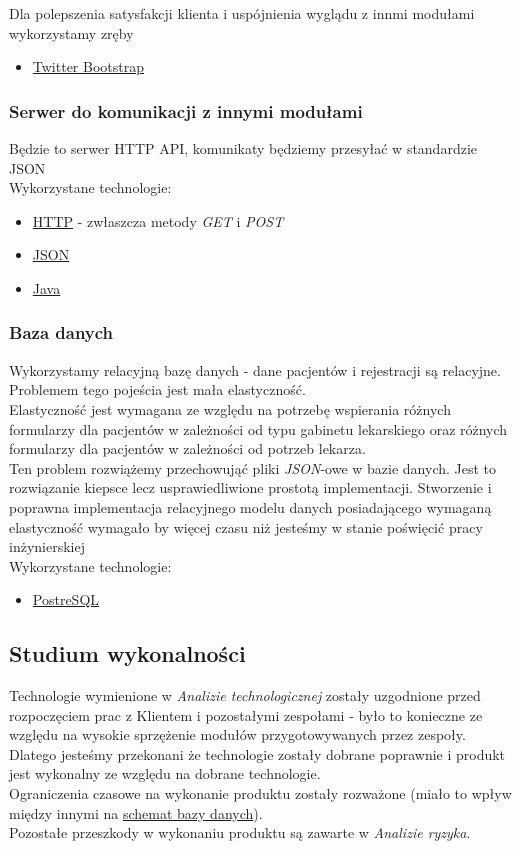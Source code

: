 \documentclass[10pt,a4paper]{article}
\begin{document}
Dla polepszenia satysfakcji klienta i uspójnienia wyglądu z innmi modułami wykorzystamy zręby
\begin{itemize}
  \item \href{https://getbootstrap.com/}{Twitter Bootstrap}
\end{itemize}

\subsubsection{Serwer do komunikacji z innymi modułami}
Będzie to serwer HTTP API, komunikaty będziemy przesyłać w standardzie JSON \\
Wykorzystane technologie:
\begin{itemize}
  \item \href{https://pl.wikipedia.org/wiki/Hypertext_Transfer_Protocol}{HTTP} - zwłaszcza metody \emph{GET} i \emph{POST}
  \item \href{http://www.json.org/}{JSON}
  \item \href{https://www.oracle.com/java/index.html}{Java}
\end{itemize}

\subsubsection{Baza danych}
\label{subsec:wykorzystane-technologie-baza}
Wykorzystamy relacyjną bazę danych - dane pacjentów i rejestracji są relacyjne. Problemem tego pojeścia jest mała elastyczność. \\
Elastyczność jest wymagana ze względu na potrzebę wspierania różnych formularzy dla pacjentów w zależności od typu gabinetu lekarskiego oraz różnych formularzy dla pacjentów w zależności od potrzeb lekarza. \\
Ten problem rozwiążemy przechowująć pliki \emph{JSON}-owe w bazie danych. Jest to rozwiązanie kiepsce lecz usprawiedliwione prostotą implementacji. Stworzenie i poprawna implementacja relacyjnego modelu danych posiadającego wymaganą elastyczność wymagało by więcej czasu niż jesteśmy w stanie poświęcić pracy inżynierskiej \\
Wykorzystane technologie:
\begin{itemize}
  \item \href{https://www.postgresql.org/}{PostreSQL}
\end{itemize}

\subsection{Studium wykonalności}
Technologie wymienione w \emph{Analizie technologicznej} zostały uzgodnione przed rozpoczęciem prac z Klientem i pozostałymi zespołami - było to konieczne ze względu na wysokie sprzężenie modułów przygotowywanych przez zespoły. Dlatego jesteśmy przekonani że technologie zostały dobrane poprawnie i produkt jest wykonalny ze względu na dobrane technologie. \\
Ograniczenia czasowe na wykonanie produktu zostały rozważone (miało to wpływ między innymi na \hyperref[subsec:wykorzystane-technologie-baza]{schemat bazy danych}). \\
Pozostałe przeszkody w wykonaniu produktu są zawarte w \emph{Analizie ryzyka}.
\end{document}
